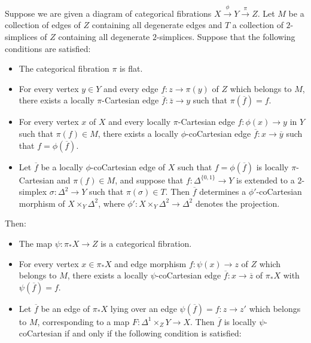 \begin{corollary}\label{falch}
Suppose we are given a diagram of categorical fibrations $X \stackrel{\phi}{\rightarrow} Y \stackrel{\pi}{\rightarrow} Z$. Let $M$ be a collection of edges of $Z$ containing all degenerate edges
and $T$ a collection of $2$-simplices of $Z$ containing all degenerate $2$-simplices.
Suppose that the following conditions are satisfied:
\begin{itemize}
\item[$(a)$] The categorical fibration $\pi$ is flat.
\item[$(b)$] For every vertex $y \in Y$ and every edge $f: z \rightarrow \pi(y)$ of
$Z$ which belongs to $M$, there exists a locally $\pi$-Cartesian edge
$\overline{f}: \overline{z} \rightarrow y$ such that $\pi( \overline{f} ) = f$.
\item[$(c)$] For every vertex $x$ of $X$ and every locally $\pi$-Cartesian edge $f: \phi(x) \rightarrow y$ in $Y$ such that $\pi(f) \in M$, there exists a locally $\phi$-coCartesian edge $\overline{f}: x \rightarrow \overline{y}$ such that $f = \phi( \overline{f} )$.
\item[$(d)$] Let $\overline{f}$ be a locally $\phi$-coCartesian edge of $X$ such that
$f = \phi( \overline{f} )$ is locally $\pi$-Cartesian and $\pi(f) \in M$, and suppose that
$f: \Delta^{ \{0,1\} } \rightarrow Y$ is extended to a $2$-simplex $\sigma: \Delta^2 \rightarrow Y$ 
such that $\pi(\sigma) \in T$. Then
$\overline{f}$ determines a $\phi'$-coCartesian morphism of $X \times_{Y} \Delta^2$, where
$\phi': X \times_{Y} \Delta^2 \rightarrow \Delta^2$ denotes the projection.
\end{itemize}
Then:
\begin{itemize}
\item[$(1)$] The map $\psi: \pi_{\ast} X \rightarrow Z$ is a categorical fibration.
\item[$(2)$] For every vertex $x \in \pi_{\ast} X$ and edge morphism $f: \psi(x) \rightarrow z$
of $Z$ which belongs to $M$, there exists a locally $\psi$-coCartesian edge
$\overline{f}: x \rightarrow \overline{z}$ of $\pi_{\ast} X$ with $\psi( \overline{f}) = f$.
\item[$(3)$] Let $\overline{f}$ be an edge of $\pi_{\ast} X$ lying
over an edge $\psi(\overline{f}) = f: z \rightarrow z'$ which belongs to $M$, corresponding to a map
$F: \Delta^1 \times_{Z} Y \rightarrow X$. Then $\overline{f}$ is locally $\psi$-coCartesian if and only if the following condition is satisfied:
\begin{itemize}

\end{itemize}
\end{itemize}
\end{corollary}

